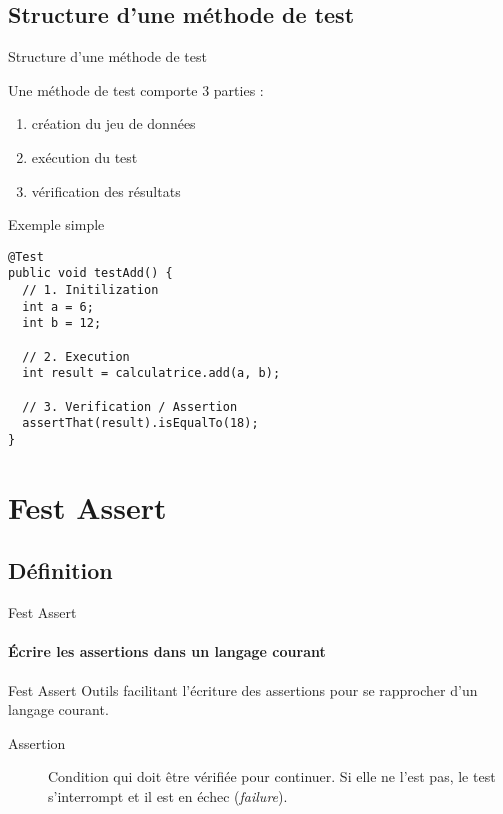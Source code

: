 \documentclass[compress]{beamer}%
\begin{document}
\subsection{Structure d'une méthode de test}

\begin{frame}{Structure d'une méthode de test}

	Une méthode de test comporte 3 parties :
	\begin{enumerate}[<+->]
	\item création du jeu de données
	\item exécution du test
	\item vérification des résultats
	\end{enumerate}
	
\end{frame}

\begin{frame}[containsverbatim]{Exemple simple}

	\begin{lstlisting}
@Test
public void testAdd() {
  // 1. Initilization
  int a = 6;
  int b = 12;
  
  // 2. Execution
  int result = calculatrice.add(a, b);
  
  // 3. Verification / Assertion
  assertThat(result).isEqualTo(18);
}
	\end{lstlisting}
\end{frame}


\section{Fest Assert}

\subsection{Définition}

\begin{frame}{Fest Assert}
	\framesubtitle{Écrire les assertions dans un langage courant}
	
	\begin{block}{Fest Assert}
		Outils facilitant l'écriture des assertions pour se rapprocher d'un langage courant.
	\end{block}
	
	\pause
	\begin{description}
	\item[Assertion] Condition qui doit être vérifiée pour continuer. Si elle ne l'est pas, le test s'interrompt et il est en échec (\emph{failure}).
	\end{description}

\end{frame}
\end{document}
